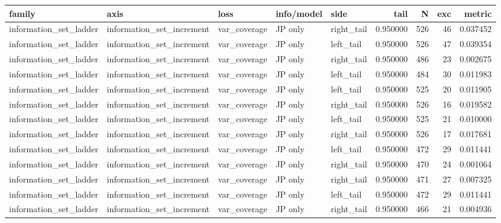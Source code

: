 \begin{tabular}{lllllrrrr}
\toprule
family & axis & loss & info/model & side & tail & N & exc & metric \\
\midrule
information\_set\_ladder & information\_set\_increment & var\_coverage & JP only & right\_tail & 0.950000 & 526 & 46 & 0.037452 \\
information\_set\_ladder & information\_set\_increment & var\_coverage & JP only & left\_tail & 0.950000 & 526 & 47 & 0.039354 \\
information\_set\_ladder & information\_set\_increment & var\_coverage & JP only & right\_tail & 0.950000 & 486 & 23 & 0.002675 \\
information\_set\_ladder & information\_set\_increment & var\_coverage & JP only & left\_tail & 0.950000 & 484 & 30 & 0.011983 \\
information\_set\_ladder & information\_set\_increment & var\_coverage & JP only & left\_tail & 0.950000 & 525 & 20 & 0.011905 \\
information\_set\_ladder & information\_set\_increment & var\_coverage & JP only & right\_tail & 0.950000 & 526 & 16 & 0.019582 \\
information\_set\_ladder & information\_set\_increment & var\_coverage & JP only & left\_tail & 0.950000 & 525 & 21 & 0.010000 \\
information\_set\_ladder & information\_set\_increment & var\_coverage & JP only & right\_tail & 0.950000 & 526 & 17 & 0.017681 \\
information\_set\_ladder & information\_set\_increment & var\_coverage & JP only & left\_tail & 0.950000 & 472 & 29 & 0.011441 \\
information\_set\_ladder & information\_set\_increment & var\_coverage & JP only & right\_tail & 0.950000 & 470 & 24 & 0.001064 \\
information\_set\_ladder & information\_set\_increment & var\_coverage & JP only & right\_tail & 0.950000 & 471 & 27 & 0.007325 \\
information\_set\_ladder & information\_set\_increment & var\_coverage & JP only & left\_tail & 0.950000 & 472 & 29 & 0.011441 \\
information\_set\_ladder & information\_set\_increment & var\_coverage & JP only & right\_tail & 0.950000 & 466 & 21 & 0.004936 \\

\end{tabular}
